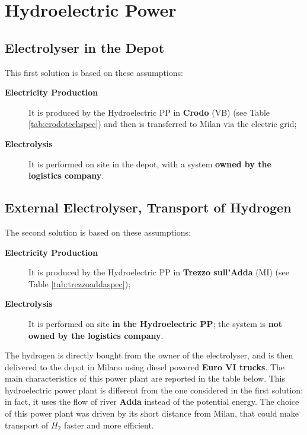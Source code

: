 

\newpage
\section{Hydroelectric Power}
\subsection{Electrolyser in the Depot}

This first solution is based on these assumptions:

\begin{description}
    \item[\textbf{Electricity Production}] It is produced by the Hydroelectric PP in \textbf{Crodo} (VB) (see Table \ref{tab:crodotechspec}) and then is transferred to Milan via the electric grid;
    \item[\textbf{Electrolysis}] It is performed on site in the depot, with a system\textbf{ owned by the logistics company}.
\end{description}



\subsection{External Electrolyser, Transport of Hydrogen}
The second solution is based on these assumptions:

\begin{description}
    \item[\textbf{Electricity Production}] It is produced by the Hydroelectric PP in \textbf{Trezzo sull'Adda} (MI) (see Table \ref{tab:trezzoaddaspec});
    \item[\textbf{Electrolysis}] It is performed on site \textbf{in the Hydroelectric PP}; the system is \textbf{not owned by the logistics company}.
\end{description}



\newpage
The hydrogen is directly bought from the owner of the electrolyser, and is then delivered to the depot in Milano using diesel powered \textbf{Euro VI trucks}. The main characteristics of this power plant are reported in the table below. This hydroelectric power plant is different from the one considered in the first solution: in fact, it uses the flow of river \textbf{Adda} instead of the potential energy. The choice of this power plant was driven by its short distance from Milan, that could make transport of $H_2$ faster and more efficient.

